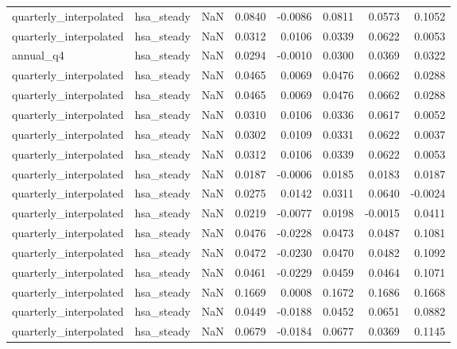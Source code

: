 \begin{tabular}{llrrrrrr}
quarterly\_interpolated & hsa\_steady & NaN & 0.0840 & -0.0086 & 0.0811 & 0.0573 & 0.1052 \\
quarterly\_interpolated & hsa\_steady & NaN & 0.0312 & 0.0106 & 0.0339 & 0.0622 & 0.0053 \\
annual\_q4 & hsa\_steady & NaN & 0.0294 & -0.0010 & 0.0300 & 0.0369 & 0.0322 \\
quarterly\_interpolated & hsa\_steady & NaN & 0.0465 & 0.0069 & 0.0476 & 0.0662 & 0.0288 \\
quarterly\_interpolated & hsa\_steady & NaN & 0.0465 & 0.0069 & 0.0476 & 0.0662 & 0.0288 \\
quarterly\_interpolated & hsa\_steady & NaN & 0.0310 & 0.0106 & 0.0336 & 0.0617 & 0.0052 \\
quarterly\_interpolated & hsa\_steady & NaN & 0.0302 & 0.0109 & 0.0331 & 0.0622 & 0.0037 \\
quarterly\_interpolated & hsa\_steady & NaN & 0.0312 & 0.0106 & 0.0339 & 0.0622 & 0.0053 \\
quarterly\_interpolated & hsa\_steady & NaN & 0.0187 & -0.0006 & 0.0185 & 0.0183 & 0.0187 \\
quarterly\_interpolated & hsa\_steady & NaN & 0.0275 & 0.0142 & 0.0311 & 0.0640 & -0.0024 \\
quarterly\_interpolated & hsa\_steady & NaN & 0.0219 & -0.0077 & 0.0198 & -0.0015 & 0.0411 \\
quarterly\_interpolated & hsa\_steady & NaN & 0.0476 & -0.0228 & 0.0473 & 0.0487 & 0.1081 \\
quarterly\_interpolated & hsa\_steady & NaN & 0.0472 & -0.0230 & 0.0470 & 0.0482 & 0.1092 \\
quarterly\_interpolated & hsa\_steady & NaN & 0.0461 & -0.0229 & 0.0459 & 0.0464 & 0.1071 \\
quarterly\_interpolated & hsa\_steady & NaN & 0.1669 & 0.0008 & 0.1672 & 0.1686 & 0.1668 \\
quarterly\_interpolated & hsa\_steady & NaN & 0.0449 & -0.0188 & 0.0452 & 0.0651 & 0.0882 \\
quarterly\_interpolated & hsa\_steady & NaN & 0.0679 & -0.0184 & 0.0677 & 0.0369 & 0.1145 \\
\bottomrule
\end{tabular}
